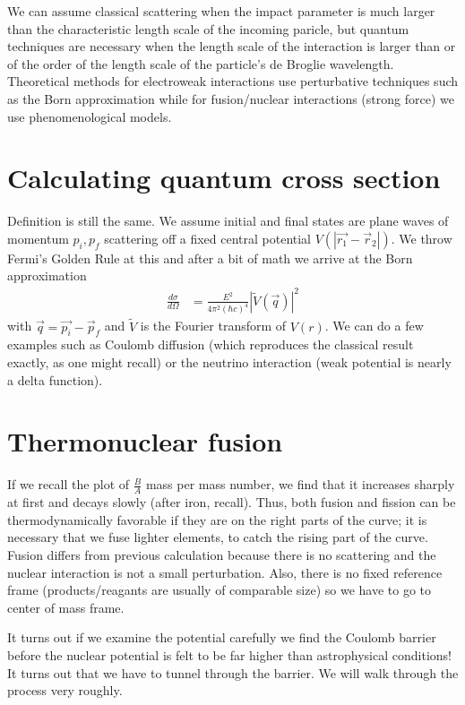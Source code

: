 \documentclass[10pt]{report}
\newcommand{\rd}[2]{\frac{d#1}{d#2}}
\newcommand{\abs}[1]{\left|#1\right|}
\begin{document}
We can assume classical scattering when the impact parameter is much larger than the characteristic length scale of the incoming paricle, but quantum techniques are necessary when the length scale of the interaction is larger than or of the order of the length scale of the particle's de Broglie wavelength. Theoretical methods for electroweak interactions use perturbative techniques such as the Born approximation while for fusion/nuclear interactions (strong force) we use phenomenological models.

\section{Calculating quantum cross section}

Definition is still the same. We assume initial and final states are plane waves of momentum $p_i, p_f$ scattering off a fixed central potential $V(\abs{\vec{r_1} - \vec{r}_2})$. We throw Fermi's Golden Rule at this and after a bit of math we arrive at the Born approximation
\begin{align}
    \rd{\sigma}{\Omega} &= \frac{E^2}{4\pi^2\left( \hbar c \right)^4}\abs{\tilde{V}(\vec{q})}^2
\end{align}
with $\vec{q} = \vec{p_i} - \vec{p}_f$ and $\tilde{V}$ is the Fourier transform of $V(r)$. We can do a few examples such as Coulomb diffusion (which reproduces the classical result exactly, as one might recall) or the neutrino interaction (weak potential is nearly a delta function).

\section{Thermonuclear fusion}

If we recall the plot of $\frac{B}{A}$ mass per mass number, we find that it increases sharply at first and decays slowly (after iron, recall). Thus, both fusion and fission can be thermodynamically favorable if they are on the right parts of the curve; it is necessary that we fuse lighter elements, to catch the rising part of the curve. Fusion differs from previous calculation because there is no scattering and the nuclear interaction is not a small perturbation. Also, there is no fixed reference frame (products/reagants are usually of comparable size) so we have to go to center of mass frame.

It turns out if we examine the potential carefully we find the Coulomb barrier before the nuclear potential is felt to be far higher than astrophysical conditions! It turns out that we have to tunnel through the barrier. We will walk through the process very roughly.
\end{document}
